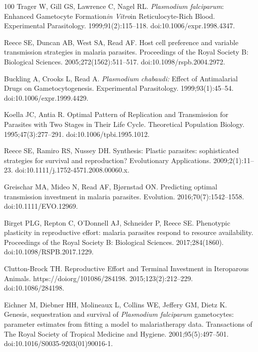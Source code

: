 \documentclass[10pt,letterpaper]{article}
\begin{document}
\begin{thebibliography}{100}
Trager W, Gill GS, Lawrence C, Nagel RL.
\newblock \textit{{Plasmodium} falciparum}: {Enhanced} {Gametocyte} {Formation}\textit{in {Vitro}}in {Reticulocyte}-{Rich} {Blood}.
\newblock Experimental Parasitology. 1999;91(2):115--118.
\newblock doi:{10.1006/expr.1998.4347}.

Reece SE, Duncan AB, West SA, Read AF.
\newblock Host cell preference and variable transmission strategies in malaria parasites.
\newblock Proceedings of the Royal Society B: Biological Sciences. 2005;272(1562):511--517.
\newblock doi:{10.1098/rspb.2004.2972}.

Buckling A, Crooks L, Read A.
\newblock \textit{{Plasmodium} chabaudi:} {Effect} of {Antimalarial} {Drugs} on {Gametocytogenesis}.
\newblock Experimental Parasitology. 1999;93(1):45--54.
\newblock doi:{10.1006/expr.1999.4429}.

Koella JC, Antia R.
\newblock Optimal {Pattern} of {Replication} and {Transmission} for {Parasites} with {Two} {Stages} in {Their} {Life} {Cycle}.
\newblock Theoretical Population Biology. 1995;47(3):277--291.
\newblock doi:{10.1006/tpbi.1995.1012}.

Reece SE, Ramiro RS, Nussey DH.
\newblock Synthesis: {Plastic} parasites: sophisticated strategies for survival and reproduction?
\newblock Evolutionary Applications. 2009;2(1):11--23.
\newblock doi:{10.1111/j.1752-4571.2008.00060.x}.

Greischar MA, Mideo N, Read AF, Bjørnstad ON.
\newblock Predicting optimal transmission investment in malaria parasites.
\newblock Evolution. 2016;70(7):1542--1558.
\newblock doi:{10.1111/EVO.12969}.

Birget PLG, Repton C, O’Donnell AJ, Schneider P, Reece SE.
\newblock Phenotypic plasticity in reproductive effort: malaria parasites respond to resource availability.
\newblock Proceedings of the Royal Society B: Biological Sciences. 2017;284(1860).
\newblock doi:{10.1098/RSPB.2017.1229}.

Clutton-Brock TH.
\newblock Reproductive {Effort} and {Terminal} {Investment} in {Iteroparous} {Animals}.
\newblock https://doiorg/101086/284198. 2015;123(2):212--229.
\newblock doi:{10.1086/284198}.

Eichner M, Diebner HH, Molineaux L, Collins WE, Jeffery GM, Dietz K.
\newblock Genesis, sequestration and survival of \textit{{Plasmodium} falciparum} gametocytes: parameter estimates from fitting a model to malariatherapy data.
\newblock Transactions of The Royal Society of Tropical Medicine and Hygiene. 2001;95(5):497--501.
\newblock doi:{10.1016/S0035-9203(01)90016-1}.


\end{thebibliography}
\end{document}
